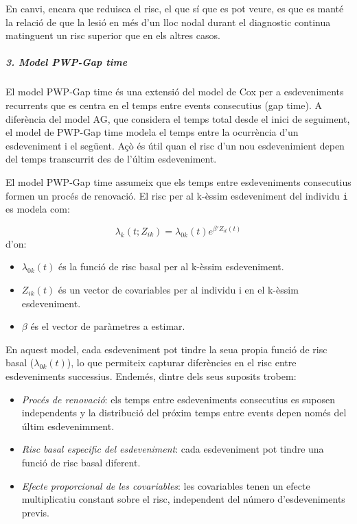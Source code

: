 \documentclass[
]{article}
\providecommand{\tightlist}{%
  \setlength{\itemsep}{0pt}\setlength{\parskip}{0pt}}
\begin{document}
En canvi, encara que reduisca el risc, el que sí que es pot veure, es
que es manté la relació de que la lesió en més d'un lloc nodal durant el
diagnostic continua matinguent un risc superior que en els altres casos.

\subparagraph{3. Model PWP-Gap time}\label{model-pwp-gap-time}

El model PWP-Gap time és una extensió del model de Cox per a
esdeveniments recurrents que es centra en el temps entre events
consecutius (gap time). A diferència del model AG, que considera el
temps total desde el inici de seguiment, el model de PWP-Gap time modela
el temps entre la ocurrència d'un esdeveniment i el següent. Açò és útil
quan el risc d'un nou esdevenimient depen del temps transcurrit des de
l'últim esdeveniment.

El model PWP-Gap time assumeix que els temps entre esdeveniments
consecutius formen un procés de renovació. El risc per al k-èssim
esdeveniment del individu \texttt{i} es modela com:

\[
\lambda_k(t;Z_{ik}) = \lambda_{0k}(t) e^{\beta'Z_{it}(t)}
\] d'on:

\begin{itemize}
\tightlist
\item
  \(\lambda_{0k}(t)\) és la funció de risc basal per al k-èssim
  esdeveniment.
\item
  \(Z_{ik}(t)\) és un vector de covariables per al individu i en el
  k-èssim esdeveniment.
\item
  \(\beta\) és el vector de paràmetres a estimar.
\end{itemize}

En aquest model, cada esdeveniment pot tindre la seua propia funció de
risc basal (\(\lambda_{0k}(t)\)), lo que permiteix capturar diferències
en el risc entre esdeveniments successius. Endemés, dintre dels seus
suposits trobem:

\begin{itemize}
\item
  \emph{Procés de renovació}: els temps entre esdeveniments consecutius
  es suposen independents y la distribució del próxim temps entre events
  depen només del últim esdevenimment.
\item
  \emph{Risc basal especific del esdeveniment}: cada esdeveniment pot
  tindre una funció de risc basal diferent.
\item
  \emph{Efecte proporcional de les covariables}: les covariables tenen
  un efecte multiplicatiu constant sobre el risc, independent del número
  d'esdeveniments previs.
\end{itemize}
\end{document}
